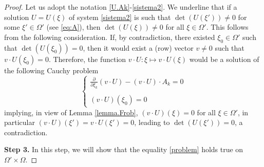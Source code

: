 \documentclass{article}
\newcommand{\de}{\partial}
\begin{document}
\begin{proof}
\noindent
Let us adopt the notation \eqref{U.Ak}-\eqref{sistema2}.
We underline that if a solution $U=U(\xi)$ of system \eqref{sistema2} is such that $\det(U(\xi'))\neq 0$ for some $\xi'\in\Omega'$ (see \eqref{eq:A}), then $\det(U(\xi))\neq 0$ for all $\xi\in\Omega'$.
 This follows from the following consideration. If, by contradiction, there existed $\xi_0\in \Omega'$ such that $\det(U(\xi_0))=0$, then it would exist a (row) vector $v\neq 0$ such that $v\cdot U(\xi_0)=0$. Therefore, the function $v\cdot U:\xi\mapsto v\cdot U(\xi)$ would be a solution of the following Cauchy problem
$$
\left\{
\begin{array}{l}
\frac{\de }{\de \xi_k}(v\cdot U)-(v\cdot U)\cdot A_k=0
\\
\\
(v\cdot U)(\xi_0)=0
\end{array}
\right.
$$
implying, in view of Lemma \ref{lemma.Frob}, $(v\cdot U)(\xi)=0$ for all $\xi\in\Omega'$, in particular $(v\cdot U)(\xi')=v\cdot U(\xi')=0$, leading to $\det(U(\xi'))=0$, a contradiction.


%
%




\medskip\noindent
\textbf{\large Step 3.}
In this step, we will show that the equality  \eqref{problem} holds true on $\Omega'\times\Omega$.


\end{proof}
\end{document}
